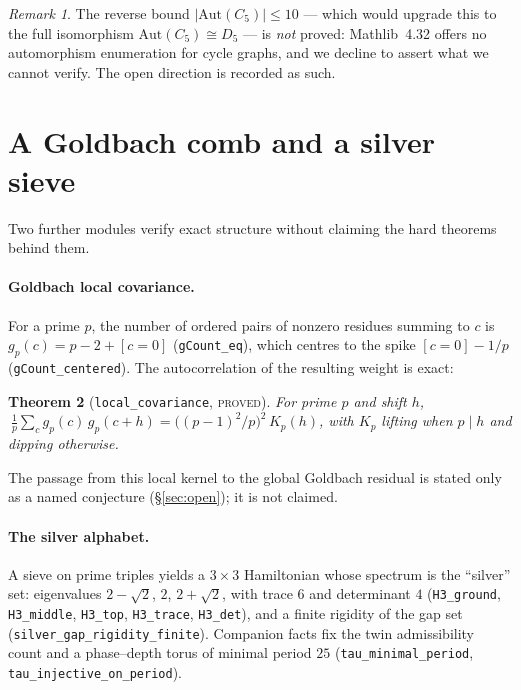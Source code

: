 \documentclass[11pt]{article}
\newtheorem{theorem}{Theorem}[section]
\theoremstyle{definition}
\theoremstyle{remark}
\newtheorem{remark}[theorem]{Remark}
\newcommand{\lean}[1]{\texttt{#1}}
\begin{document}
\begin{remark}
The reverse bound $\lvert\mathrm{Aut}(C_5)\rvert\le 10$ --- which would upgrade this to the full
isomorphism $\mathrm{Aut}(C_5)\cong D_5$ --- is \emph{not} proved: Mathlib~4.32 offers no
automorphism enumeration for cycle graphs, and we decline to assert what we cannot verify. The
open direction is recorded as such.
\end{remark}

\section{A Goldbach comb and a silver sieve}\label{sec:analysis}

Two further modules verify exact structure without claiming the hard theorems behind them.

\paragraph{Goldbach local covariance.} For a prime $p$, the number of ordered pairs of nonzero
residues summing to $c$ is $g_p(c)=p-2+[c=0]$ (\lean{gCount\_eq}), which centres to the spike
$[c=0]-1/p$ (\lean{gCount\_centered}). The autocorrelation of the resulting weight is exact:

\begin{theorem}[\lean{local\_covariance}, \textsc{proved}]
For prime $p$ and shift $h$,
$\ \frac1p\sum_{c}g_p(c)\,g_p(c+h)=\bigl((p-1)^2/p\bigr)^2\,K_p(h)$, with $K_p$ lifting when
$p\mid h$ and dipping otherwise.
\end{theorem}

\noindent The passage from this local kernel to the global Goldbach residual is stated only as
a named conjecture (\S\ref{sec:open}); it is not claimed.

\paragraph{The silver alphabet.} A sieve on prime triples yields a $3\times3$ Hamiltonian whose
spectrum is the ``silver'' set: eigenvalues $2-\sqrt2$, $2$, $2+\sqrt2$, with trace $6$ and
determinant $4$ (\lean{H3\_ground}, \lean{H3\_middle}, \lean{H3\_top}, \lean{H3\_trace},
\lean{H3\_det}), and a finite rigidity of the gap set (\lean{silver\_gap\_rigidity\_finite}).
Companion facts fix the twin admissibility count and a phase--depth torus of minimal period $25$
(\lean{tau\_minimal\_period}, \lean{tau\_injective\_on\_period}).
\end{document}
